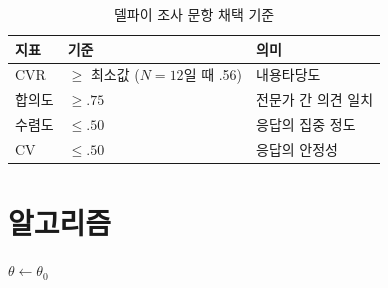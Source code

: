 \begin{table}[htbp]
  \centering
  \caption{델파이 조사 문항 채택 기준}\label{tab:delphi-criteria}
  \begin{tabular}{lll}
    \toprule
    지표 & 기준 & 의미 \\
    \midrule
    CVR & $\geq$ 최소값 ($N=12$일 때 .56) & 내용타당도 \\
    합의도 & $\geq .75$ & 전문가 간 의견 일치 \\
    수렴도 & $\leq .50$ & 응답의 집중 정도 \\
    CV & $\leq .50$ & 응답의 안정성 \\
    \bottomrule
  \end{tabular}
\end{table}

\section{알고리즘}
\begin{algorithm}[htbp]
  \caption{제안 알고리즘}\label{alg:proposed}
  $\theta \leftarrow \theta_0$\;
  \Return{$\theta$}\;
\end{algorithm}
